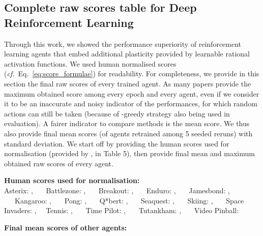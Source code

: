 \documentclass[accepted]{article}
\theoremstyle{plain}
\theoremstyle{definition}
\theoremstyle{remark}
\newcommand{\cf}{\emph{cf.}~}
\begin{document}
\subsection{Complete raw scores table for Deep Reinforcement Learning}
\label{app:all_scores_tables}
Through this work, we showed the performance superiority of reinforcement learning agents that embed additional plasticity provided by learnable rational activation functions. We used human normalised scores (\cf Eq.~\ref{eq:score_formulae}) for readability. For completeness, we provide in this section the final raw scores of every trained agent. As many papers provide the maximum obtained score among every epoch and every agent, even if we consider it to be an inaccurate and noisy indicator of the performances, for which random actions can still be taken (because of -greedy strategy also being used in evaluation). A fairer indicator to compare methods is the mean score. We thus also provide final mean scores (of agents retrained among 5 seeded reruns) with standard deviation. We start off by providing the human scores used for normalisation (provided by \citeauthor{van2016deep}, in Table 5), then provide final mean and maximum obtained raw scores of every agent.

\textbf{Human scores used for normalisation:}\\
Asterix: , \ \ \ Battlezone: , \ \ \ Breakout: , \ \ \ Enduro: , \ \ \ Jamesbond: , \ \ \ Kangaroo: , \ \ \ Pong: , \ \ \ Q*bert: , \ \ \ Seaquest: , \ \ \ Skiing: , \ \ \ Space Invaders: , \ \ Tennis: ,  \ \ \ Time Pilot: ,  \ \ \ Tutankham: ,  \ \ \ Video Pinball: 

\newpage
\textbf{Final mean scores of other agents:}
\end{document}
